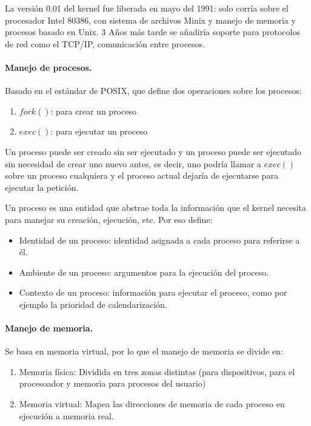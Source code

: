 \documentclass[spanish]{article}
\begin{document}
La versión 0.01 del kernel fue liberada en mayo del 1991: solo corría sobre el procesador Intel 80386, con sistema de archivos Minix y manejo de memoria y procesos basado en Unix. 3 Años más tarde se añadiría soporte para protocolos de red como el TCP/IP, comunicación entre procesos.

\pagebreak
\paragraph{Manejo de procesos.} Basado en el estándar de POSIX, que define dos operaciones sobre los procesos:
\begin{enumerate}
  \item $fork()$: para crear un proceso
  \item $exec()$: para ejecutar un proceso
\end{enumerate}

Un proceso puede ser creado sin ser ejecutado y un proceso puede ser ejecutado sin necesidad de crear uno nuevo antes, es decir, uno podría llamar a $exec()$ sobre un proceso cualquiera y el proceso actual dejaría de ejecutarse para ejecutar la petición.

Un proceso es una entidad que abstrae toda la información que el kernel necesita para manejar su creación, ejecución, etc. Por eso define:
\begin{itemize}
  \item Identidad de un proceso: identidad asignada a cada proceso para referirse a él.
  \item Ambiente de un proceso: argumentos para la ejecución del proceso.
  \item Contexto de un proceso: información para ejecutar el proceso, como por ejemplo la prioridad de calendarización.
\end{itemize} 

\paragraph{Manejo de memoria.} Se basa en memoria virtual, por lo que el manejo de memoria se divide en:
\begin{enumerate}
  \item Memoria física: Dividida en tres zonas distintas (para dispositivos, para el procesoador y memoria para procesos del usuario)
  \item Memoria virtual: Mapea las direcciones de memoria de cada proceso en ejecución a memoria real. 
\end{enumerate}
\end{document}
